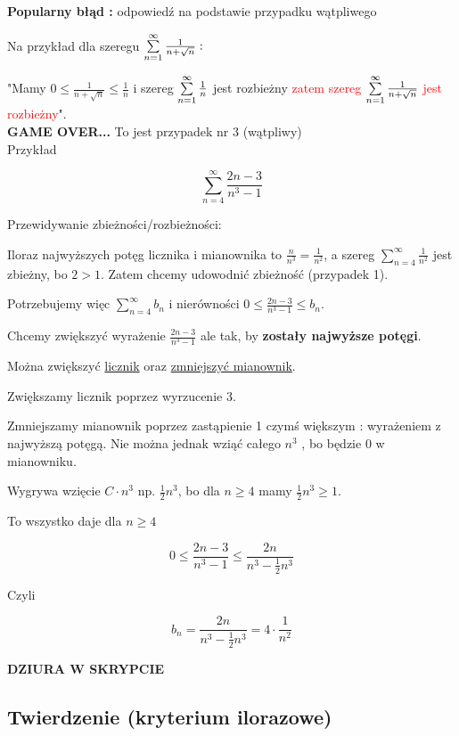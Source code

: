 \textbf{Popularny błąd : } odpowiedź na podstawie przypadku wątpliwego

Na przykład dla szeregu $ \sum\limits_{n = 1}^{\infty} \frac{1}{n + \sqrt{n}} : $

"Mamy $ 0 \leq \frac{1}{n + \sqrt{n}} \leq \frac{1}{n} $ i szereg $ \sum\limits_{n = 1}^{\infty} \frac{1}{n} $
jest rozbieżny \textcolor{red}{zatem szereg $\sum\limits_{n = 1}^{\infty} \frac{1}{n + \sqrt{n}}$ jest rozbieżny}". \\

\textbf{GAME OVER...} To jest przypadek nr 3 (wątpliwy) \\

Przykład

$$ \sum\limits_{n = 4}^{\infty} \frac{2n - 3}{n^3 - 1} $$

Przewidywanie zbieżności/rozbieżności:

Iloraz najwyższych potęg licznika i mianownika to $ \frac{n}{n^3} = \frac{1}{n^2} $, a szereg $ \sum\limits_{n = 4}^{\infty} \frac{1}{n^2} $
jest zbieżny, bo $ 2 > 1 $. Zatem chcemy udowodnić zbieżność (przypadek 1).

Potrzebujemy więc $ \sum\limits_{n = 4}^{\infty} b_n $ i nierówności $ 0 \leq \frac{2n - 3}{n^3 - 1} \leq b_n $.

Chcemy zwiększyć wyrażenie $ \frac{2n - 3}{n^3 - 1} $ ale tak, by \textbf{zostały najwyższe potęgi}.

Można zwiększyć \underline{licznik} oraz \underline{zmniejszyć mianownik}.

Zwiększamy licznik poprzez wyrzucenie 3.

Zmniejszamy mianownik poprzez zastąpienie 1 czymś większym : wyrażeniem z najwyższą potęgą. Nie można jednak wziąć całego $n^3$
, bo będzie 0 w mianowniku.

Wygrywa wzięcie $ C \cdot n^3 $ np. $ \frac{1}{2} n^3 $, bo dla $ n \geq 4 $ mamy $ \frac{1}{2} n^3 \geq 1 $.

To wszystko daje dla $ n \geq 4 $

$$ 0 \leq \frac{2n - 3}{n^3 - 1} \leq \frac{2n}{n^3 - \frac{1}{2} n^3} $$

Czyli

$$ b_n = \frac{2n}{n^3 - \frac{1}{2}n^3} = 4 \cdot \frac{1}{n^2} $$

\textbf{DZIURA W SKRYPCIE}

\subsection*{Twierdzenie (kryterium ilorazowe)}

